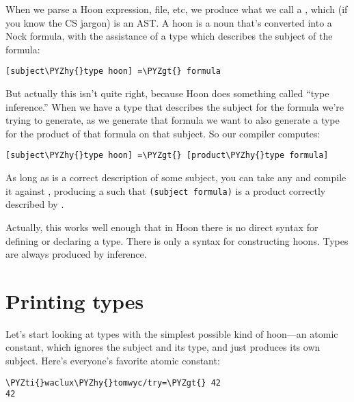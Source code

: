 When we parse a Hoon expression, file, etc, we produce what we
call a , which (if you know the CS jargon) is an AST.  A
hoon is a noun that's converted into a Nock formula, with
the assistance of a type which describes the subject of the
formula:

\begin{framed_shaded}
\begin{Verbatim}[fontsize=\relsize{-2.5},fontseries=b,commandchars=\\\{\}]
[subject\PYZhy{}type hoon] =\PYZgt{} formula
\end{Verbatim}
\end{framed_shaded}

But actually this isn't quite right, because Hoon does something
called ``type inference.''  When we have a type that describes the
subject for the formula we're trying to generate, as we generate
that formula we want to also generate a type for the product of
that formula on that subject.  So our compiler computes:

\begin{framed_shaded}
\begin{Verbatim}[fontsize=\relsize{-2.5},fontseries=b,commandchars=\\\{\}]
[subject\PYZhy{}type hoon] =\PYZgt{} [product\PYZhy{}type formula]
\end{Verbatim}
\end{framed_shaded}

As long as  is a correct description of some
subject, you can take any  and compile it against
, producing a  such that {\tt *(subject
formula)} is a product correctly described by .

Actually, this works well enough that in Hoon there is no direct
syntax for defining or declaring a type.  There is only a syntax
for constructing hoons.  Types are always produced by inference.

\section{Printing types}

Let's start looking at types with the simplest possible kind of
hoon---an atomic constant, which ignores the subject and its
type, and just produces its own subject.  Here's everyone's
favorite atomic constant:

\begin{framed_shaded}
\begin{Verbatim}[fontsize=\relsize{-2.5},fontseries=b,commandchars=\\\{\}]
\PYZti{}waclux\PYZhy{}tomwyc/try=\PYZgt{} 42
42
\end{Verbatim}
\end{framed_shaded}


